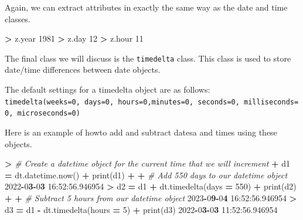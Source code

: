 \documentclass[
]{book}
\newenvironment{Shaded}{\begin{snugshade}}{\end{snugshade}}
\newcommand{\BuiltInTok}[1]{#1}
\newcommand{\CommentTok}[1]{\textcolor[rgb]{0.56,0.35,0.01}{\textit{#1}}}
\newcommand{\DecValTok}[1]{\textcolor[rgb]{0.00,0.00,0.81}{#1}}
\newcommand{\ErrorTok}[1]{\textcolor[rgb]{0.64,0.00,0.00}{\textbf{#1}}}
\newcommand{\FloatTok}[1]{\textcolor[rgb]{0.00,0.00,0.81}{#1}}
\newcommand{\NormalTok}[1]{#1}
\newcommand{\OperatorTok}[1]{\textcolor[rgb]{0.81,0.36,0.00}{\textbf{#1}}}
\begin{document}
Again, we can extract attributes in exactly the same way as the date and time classes.

\begin{Shaded}
\begin{Highlighting}[]
\OperatorTok{\textgreater{}}\NormalTok{ z.year}
\DecValTok{1981}
\OperatorTok{\textgreater{}}\NormalTok{ z.day}
\DecValTok{12}
\OperatorTok{\textgreater{}}\NormalTok{ z.hour}
\DecValTok{11}
\end{Highlighting}
\end{Shaded}

The final class we will discuss is the \texttt{timedelta} class. This class is used to store date/time differences between date objects.

The default settings for a timedelta object are as follows: \texttt{timedelta(weeks=0,\ days=0,\ hours=0,minutes=0,\ seconds=0,\ milliseconds=0,\ microseconds=0)}

Here is an example of howto add and subtract datesa and times using these objects.

\begin{Shaded}
\begin{Highlighting}[]
\OperatorTok{\textgreater{}} \CommentTok{\# Create a datetime object for the current time that we will increment}
\OperatorTok{+}\NormalTok{ d1 }\OperatorTok{=}\NormalTok{ dt.datetime.now()}
\OperatorTok{+} \BuiltInTok{print}\NormalTok{(d1)}
\OperatorTok{+} 
\OperatorTok{+} \CommentTok{\# Add 550 days to our datetime object }
\DecValTok{2022}\OperatorTok{{-}}\DecValTok{0}\ErrorTok{3}\OperatorTok{{-}}\DecValTok{0}\ErrorTok{3} \DecValTok{16}\NormalTok{:}\DecValTok{52}\NormalTok{:}\FloatTok{56.946954}
\OperatorTok{\textgreater{}}\NormalTok{ d2 }\OperatorTok{=}\NormalTok{ d1 }\OperatorTok{+}\NormalTok{ dt.timedelta(days }\OperatorTok{=} \DecValTok{550}\NormalTok{)}
\OperatorTok{+} \BuiltInTok{print}\NormalTok{(d2)}
\OperatorTok{+} 
\OperatorTok{+} \CommentTok{\# Subtract 5 hours from our datetime object }
\DecValTok{2023}\OperatorTok{{-}}\DecValTok{0}\ErrorTok{9}\OperatorTok{{-}}\DecValTok{0}\ErrorTok{4} \DecValTok{16}\NormalTok{:}\DecValTok{52}\NormalTok{:}\FloatTok{56.946954}
\OperatorTok{\textgreater{}}\NormalTok{ d3 }\OperatorTok{=}\NormalTok{ d1 }\OperatorTok{{-}}\NormalTok{ dt.timedelta(hours }\OperatorTok{=} \DecValTok{5}\NormalTok{)}
\OperatorTok{+} \BuiltInTok{print}\NormalTok{(d3)}
\DecValTok{2022}\OperatorTok{{-}}\DecValTok{0}\ErrorTok{3}\OperatorTok{{-}}\DecValTok{0}\ErrorTok{3} \DecValTok{11}\NormalTok{:}\DecValTok{52}\NormalTok{:}\FloatTok{56.946954}
\end{Highlighting}
\end{Shaded}
\end{document}

